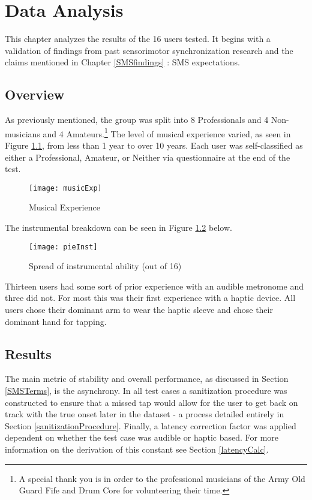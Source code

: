 \chapter{Data Analysis} \label{DataAnalysis}
This chapter analyzes the results of the 16 users tested. It begins with a validation of findings from past sensorimotor synchronization research and the claims mentioned in Chapter \ref{SMSfindings} : SMS expectations. 

\section{Overview}
As previously mentioned, the group was split into 8 Professionals and 4 Non-musicians and 4 Amateurs.\footnote{A special thank you is in order to the professional musicians of the Army Old Guard Fife and Drum Core for volunteering their time.} The level of musical experience varied, as seen in Figure \ref{fig:musicExp}, from less than 1 year to over 10 years. Each user was self-classified as either a Professional, Amateur, or Neither via questionnaire at the end of the test.
\begin{figure}[H]\label{fig:musicExp}
    \centering
    \texttt{[image: musicExp]}
    \caption{Musical Experience}
\end{figure}
The instrumental breakdown can be seen in Figure \ref{fig:pieInst} below.
\begin{figure}[H]\label{fig:pieInst}
    \centering
    \texttt{[image: pieInst]}
    \caption{Spread of instrumental ability (out of 16)}
\end{figure}
Thirteen users had some sort of prior experience with an audible metronome and three did not. For most this was their first experience with a haptic device. All users chose their dominant arm to wear the haptic sleeve and chose their dominant hand for tapping.

\section{Results}
The main metric of stability and overall performance, as discussed in Section \ref{SMSTerms}, is the asynchrony. In all test cases a sanitization procedure was constructed to ensure that a missed tap would allow for the user to get back on track with the true onset later in the dataset - a process detailed entirely in Section \ref{sanitizationProcedure}. Finally, a latency correction factor was applied dependent on whether the test case was audible or haptic based. For more information on the derivation of this constant see Section \ref{latencyCalc}.


